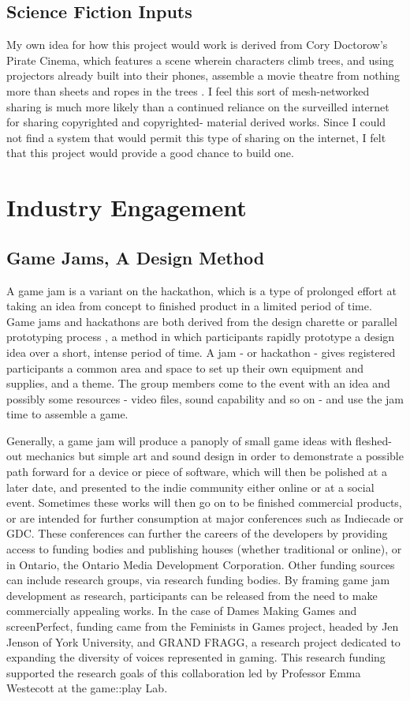 \subsection{Science Fiction Inputs}
My own idea for how this project would work is derived from Cory Doctorow's Pirate Cinema, which features a scene wherein characters climb trees, and using projectors already built into their phones, assemble a movie theatre from nothing more than sheets and ropes in the trees \parencite{doctorow}. I feel this sort of mesh-networked sharing is much more likely than a continued reliance on the surveilled internet for sharing copyrighted and copyrighted- material derived works. Since I could not find a system that would permit this type of sharing on the internet, I felt that this project would provide a good chance to build one.
 
\section{Industry Engagement}
\subsection{Game Jams, A Design Method}
A game jam is a variant on the hackathon, which is a type of prolonged effort at taking an idea from concept to finished product in a limited period of time. Game jams and hackathons are both derived from the design charette or parallel prototyping process \parencite{martin}, a method in which participants rapidly prototype a design idea over a short, intense period of time. A jam - or hackathon - gives registered participants a common area and space to set up their own equipment and supplies, and a theme. The group members come to the event with an idea and possibly some resources - video files, sound capability and so on - and use the jam time to assemble a game.

Generally, a game jam will produce a panoply of small game ideas with fleshed-out mechanics but simple art and sound design in order to demonstrate a possible path forward for a device or piece of software, which will then be polished at a later date, and presented to the indie community either online or at a social event. Sometimes these works will then go on to be finished commercial products, or are intended for further consumption at major conferences such as Indiecade or GDC. These conferences can further the careers of the developers by providing access to funding bodies and publishing houses (whether traditional or online), or in Ontario, the Ontario Media Development Corporation. Other funding sources can include research groups, via research funding bodies. By framing game jam development as research, participants can be released from the need to make commercially appealing works. In the case of Dames Making Games and screenPerfect, funding came from the Feminists in Games project, headed by Jen Jenson of York University, and GRAND FRAGG, a research project dedicated to expanding the diversity of voices represented in gaming. This research funding supported the research goals of this collaboration led by Professor Emma Westecott at the game::play Lab.

